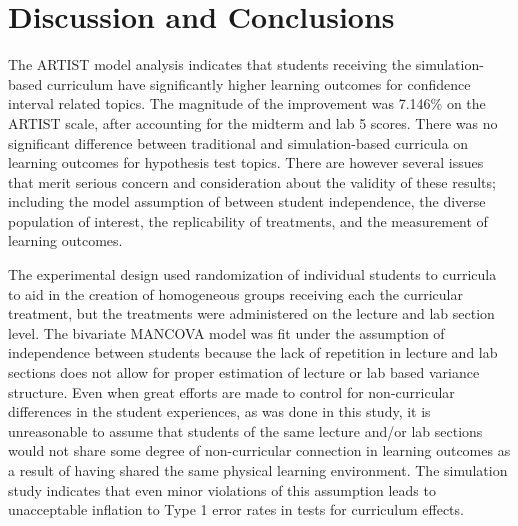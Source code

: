 \documentclass[11pt]{isuthesis}\usepackage[]{graphicx}\usepackage[]{color}
\newcommand{\km}[1]{{\color{red} #1}}
\begin{document}
\km{
\section{Discussion and Conclusions}
\label{discussion}

The ARTIST model analysis indicates that students receiving the simulation-based curriculum have significantly higher learning outcomes for confidence interval related topics. The magnitude of the improvement was 7.146\% on the ARTIST scale, after accounting for the midterm and lab 5 scores. There was no significant difference between traditional and simulation-based curricula on learning outcomes for hypothesis test topics. There are however several issues that merit serious concern and consideration about the validity of these results; including the model assumption of between student independence, the diverse population of interest, the replicability of treatments, and the measurement of learning outcomes. }

\km{The experimental design used randomization of individual students to curricula to aid in the creation of homogeneous groups receiving each the curricular treatment, but the treatments were administered on the lecture and lab section level. The bivariate MANCOVA model was fit under the assumption of independence between students because the lack of repetition in lecture and lab sections does not allow for proper estimation of lecture or lab based variance structure. Even when great efforts are made to control for non-curricular differences in the student experiences, as was done in this study, it is unreasonable to assume that students of the same lecture and/or lab sections would not share some degree of non-curricular connection in learning outcomes as a result of having shared the same physical learning environment. The simulation study indicates that even minor violations of this assumption leads to unacceptable inflation to Type 1 error rates in tests for curriculum effects. }
\end{document}

